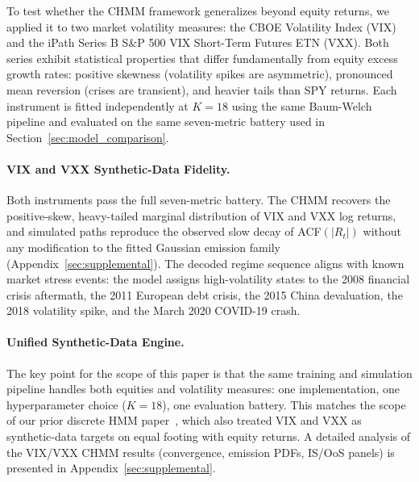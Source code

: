 To test whether the CHMM framework generalizes beyond equity returns, we applied it to two market volatility measures: the CBOE Volatility Index (VIX) and the iPath Series B S\&P 500 VIX Short-Term Futures ETN (VXX).
Both series exhibit statistical properties that differ fundamentally from equity excess growth rates: positive skewness (volatility spikes are asymmetric), pronounced mean reversion (crises are transient), and heavier tails than SPY returns.
Each instrument is fitted independently at $K = 18$ using the same Baum-Welch pipeline and evaluated on the same seven-metric battery used in Section~\ref{sec:model_comparison}.

\paragraph{VIX and VXX Synthetic-Data Fidelity.}
Both instruments pass the full seven-metric battery.
The CHMM recovers the positive-skew, heavy-tailed marginal distribution of VIX and VXX log returns, and simulated paths reproduce the observed slow decay of ACF$(|R_t|)$ without any modification to the fitted Gaussian emission family (Appendix~\ref{sec:supplemental}).
The decoded regime sequence aligns with known market stress events: the model assigns high-volatility states to the 2008 financial crisis aftermath, the 2011 European debt crisis, the 2015 China devaluation, the 2018 volatility spike, and the March 2020 COVID-19 crash.

\paragraph{Unified Synthetic-Data Engine.}
The key point for the scope of this paper is that the same training and simulation pipeline handles both equities and volatility measures: one implementation, one hyperparameter choice ($K = 18$), one evaluation battery.
This matches the scope of our prior discrete HMM paper~\citep{alswaidan2026hybrid}, which also treated VIX and VXX as synthetic-data targets on equal footing with equity returns.
A detailed analysis of the VIX/VXX CHMM results (convergence, emission PDFs, IS/OoS panels) is presented in Appendix~\ref{sec:supplemental}.
